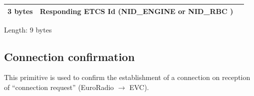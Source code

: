 \documentclass[nocc]{template/openetcs_report}
\begin{document}
\begin{longtable}{|l|l|l|}
				\hline
					 \begin{minipage}[t]{0.1\linewidth}3 bytes \end{minipage}
					&\begin{minipage}[t]{0.6\linewidth}Responding ETCS Id (NID\_ENGINE or NID\_RBC )\end{minipage}
					&\begin{minipage}[t]{0.3\linewidth}\end{minipage} \\
				\hline
			\end{longtable}
			Length: 9 bytes
\subsection{Connection confirmation}
This primitive is used to confirm the establishment of a connection on reception of "`connection request"' (EuroRadio $\rightarrow$ EVC).
\end{document}
